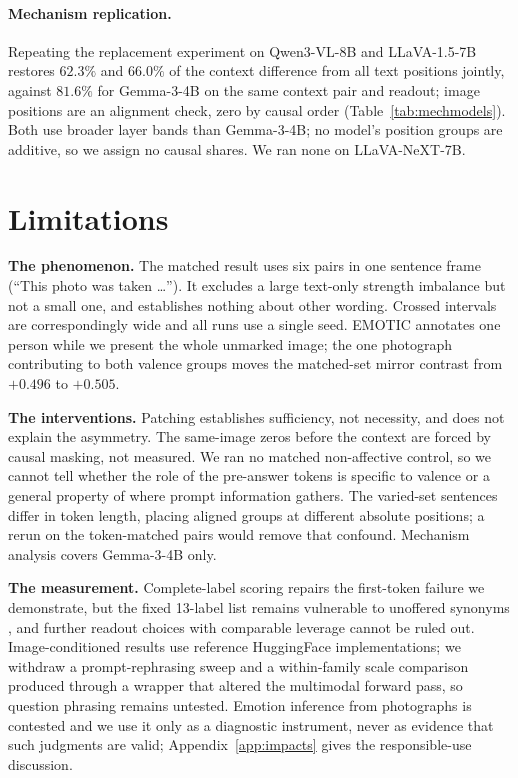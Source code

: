 \documentclass{article}
\newif\ifshort
\newcommand{\gemma}{Gemma-3-4B}
\newcommand{\qwen}{Qwen3-VL-8B}
\newcommand{\llava}{LLaVA-1.5-7B}
\newcommand{\llavanext}{LLaVA-NeXT-7B}
\begin{document}
\paragraph{Mechanism replication.} Repeating the replacement experiment on \qwen{} and \llava{} restores $62.3\%$ and $66.0\%$ of the context difference from all text positions jointly, against $81.6\%$ for \gemma{} on the same context pair and readout; image positions are an alignment check, zero by causal order (Table~\ref{tab:mechmodels}). Both use broader layer bands than \gemma{}; no model's position groups are additive, so we assign no causal shares. We ran none on \llavanext{}.
\fi

\ifshort
\section{Limitations}
\label{sec:limitations}
\label{sec:discussion}

\textbf{The phenomenon.} The matched result uses six pairs in one sentence frame (``This photo was taken \ldots''). It excludes a large text-only strength imbalance but not a small one, and establishes nothing about other wording. Crossed intervals are correspondingly wide and all runs use a single seed. EMOTIC annotates one person while we present the whole unmarked image; the one photograph contributing to both valence groups moves the matched-set mirror contrast from $+0.496$ to $+0.505$.

\textbf{The interventions.} Patching establishes sufficiency, not necessity, and does not explain the asymmetry. The same-image zeros before the context are forced by causal masking, not measured. We ran no matched non-affective control, so we cannot tell whether the role of the pre-answer tokens is specific to valence or a general property of where prompt information gathers. The varied-set sentences differ in token length, placing aligned groups at different absolute positions; a rerun on the token-matched pairs would remove that confound. Mechanism analysis covers \gemma{} only.

\textbf{The measurement.} Complete-label scoring repairs the first-token failure we demonstrate, but the fixed 13-label list remains vulnerable to unoffered synonyms \citep{holtzman2021}, and further readout choices with comparable leverage cannot be ruled out. Image-conditioned results use reference HuggingFace implementations; we withdraw a prompt-rephrasing sweep and a within-family scale comparison produced through a wrapper that altered the multimodal forward pass, so question phrasing remains untested. Emotion inference from photographs is contested and we use it only as a diagnostic instrument, never as evidence that such judgments are valid; Appendix~\ref{app:impacts} gives the responsible-use discussion.
\end{document}
